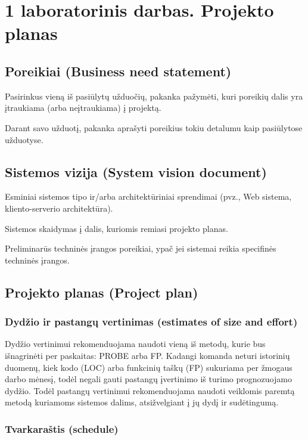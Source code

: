 \documentclass[12pt,a4paper]{article}
\begin{document}
\section*{1 laboratorinis darbas. Projekto planas}

\subsection*{Poreikiai (Business need statement)}

Pasirinkus vieną iš pasiūlytų užduočių, pakanka pažymėti, kuri poreikių dalis yra įtraukiama (arba neįtraukiama) į projektą.

Darant savo užduotį, pakanka aprašyti poreikius tokiu detalumu kaip pasiūlytose užduotyse.

\subsection*{Sistemos vizija (System vision document)}

Esminiai sistemos tipo ir/arba architektūriniai sprendimai (pvz., Web sistema, kliento-serverio architektūra).

Sistemos skaidymas į dalis, kuriomis remiasi projekto planas.

Preliminarūs techninės įrangos poreikiai, ypač jei sistemai reikia specifinės techninės įrangos.

\subsection*{Projekto planas (Project plan)}

\subsubsection*{Dydžio ir pastangų vertinimas (estimates of size and effort)}

Dydžio vertinimui rekomenduojama naudoti vieną iš metodų, kurie bus išnagrinėti per paskaitas: PROBE arba FP. Kadangi komanda neturi istorinių duomenų, kiek kodo (LOC) arba funkcinių taškų (FP) sukuriama per žmogaus darbo mėnesį, todėl negali gauti pastangų įvertinimo iš turimo prognozuojamo dydžio. Todėl pastangų vertinimui rekomenduojama naudoti veiklomis paremtą metodą kuriamoms sistemos dalims, atsižvelgiant į jų dydį ir sudėtingumą.

\subsubsection*{Tvarkaraštis (schedule)}
\end{document}
